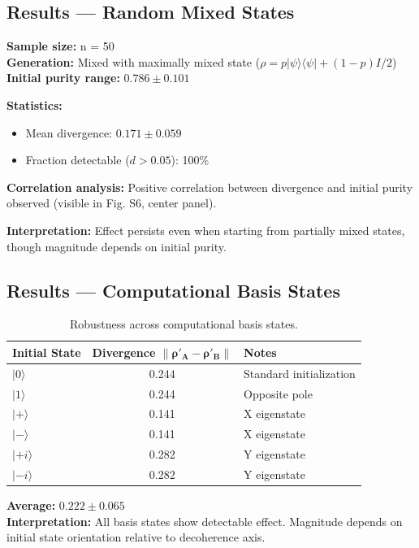 \documentclass[11pt, onecolumn, letterpaper]{article}
\begin{document}
\subsection{Results --- Random Mixed States}
\textbf{Sample size:} n = 50 \\
\textbf{Generation:} Mixed with maximally mixed state ($\rho = p|\psi\rangle\langle\psi| + (1-p)I/2$) \\
\textbf{Initial purity range:} $0.786 \pm 0.101$

\textbf{Statistics:}
\begin{itemize}
    \item Mean divergence: $0.171 \pm 0.059$
    \item Fraction detectable ($d > 0.05$): 100\%
\end{itemize}
\textbf{Correlation analysis:} Positive correlation between divergence and initial purity observed (visible in Fig. S6, center panel).

\textbf{Interpretation:} Effect persists even when starting from partially mixed states, though magnitude depends on initial purity.

\subsection{Results --- Computational Basis States}
\begin{table}[h!]
\centering
\begin{tabular}{l c l}
\toprule
\textbf{Initial State} & \textbf{Divergence $\boldsymbol{\|\rho'_A - \rho'_B\|}$} & \textbf{Notes} \\
\midrule
$|0\rangle$ & 0.244 & Standard initialization \\
$|1\rangle$ & 0.244 & Opposite pole \\
$|+\rangle$ & 0.141 & X eigenstate \\
$|-\rangle$ & 0.141 & X eigenstate \\
$|+i\rangle$ & 0.282 & Y eigenstate \\
$|-i\rangle$ & 0.282 & Y eigenstate \\
\bottomrule
\end{tabular}
\caption{Robustness across computational basis states.}
\label{tab:basis_states_appendix}
\end{table}

\noindent\textbf{Average:} $0.222 \pm 0.065$ \\
\textbf{Interpretation:} All basis states show detectable effect. Magnitude depends on initial state orientation relative to decoherence axis.
\end{document}
